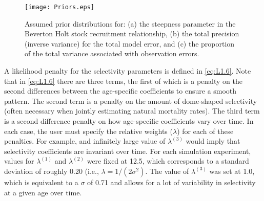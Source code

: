 \documentclass[review,letterpaper,10pt,authoryear]{elsarticle}
\begin{document}
\begin{figure}[tb]
	\begin{center}
		\texttt{[image: Priors.eps]}
	\end{center}
	\caption{Assumed prior distributions for: (a) the steepness parameter in the Beverton Holt stock recruitment relationship, (b) the total precision (inverse variance) for the total model error, and (c) the proportion of the total variance associated with observation errors.}
	\label{fig:prior}
\end{figure}


A likelihood penalty for the selectivity parameters is defined in \eqref{eq:L1.6}.  Note that in \eqref{eq:L1.6} there are three terms, the first of which is a penalty on the second differences between the age-specific coefficients to ensure a smooth pattern.  The second term is a penalty on the amount of dome-shaped selectivity (often necessary when jointly estimating natural mortality rates).  The third term is a second difference penalty on how age-specific coefficients vary over time.  In each case, the user must specify the relative weights ($\lambda$) for each of these penalties.   For example, and infinitely large value of $\lambda^{(3)}$ would imply that selectivity coefficients are invariant over time.  For each simulation experiment, values for $\lambda^{(1)}$ and $\lambda^{(2)}$ were fixed at 12.5, which corresponds to a standard deviation of roughly 0.20 (i.e., $\lambda = 1/(2 \sigma^2)$.  The value of $\lambda^{(3)}$ was set at 1.0, which is equivalent to a $\sigma$ of 0.71 and allows for a lot of variability in selectivity at a given age over time.



\end{document}
